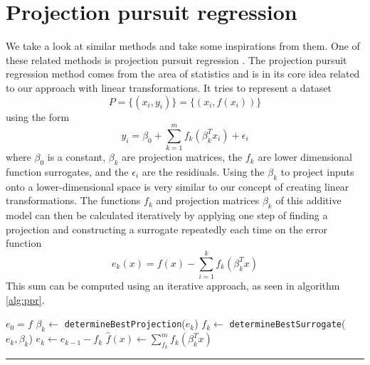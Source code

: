 \documentclass[
  a4paper,  %
  twoside,  %
  bibliography=totoc,
  headsepline,
  cleardoublepage=empty,
  parskip=half,
  draft=false
]{scrbook}
\newcommand{\delimit}{{\color{charcoal}\noindent\rule{\textwidth}{1pt}}}
\begin{document}
\section{Projection pursuit regression}

We take a look at similar methods and take some inspirations from them.
One of these related methods is projection pursuit regression \cite{}.
The projection pursuit regression method comes from the area of statistics and is in its core idea related to our approach with linear transformations.
It tries to represent a dataset
\begin{equation}
P=\{(x_i, y_i)\}=\{(x_i, f(x_i))\}
\end{equation}
using the form
\begin{equation}
y_i=\beta_0 + \sum_{k=1}^m f_k(\beta_k^T x_i) + \epsilon_i
\label{ppr}
\end{equation}
where $\beta_0$ is a constant, $\beta_k$ are projection matrices, the $f_k$ are lower dimensional function surrogates, and the $\epsilon_i$ are the residiuals.
Using the $\beta_k$ to project inputs onto a lower-dimensional space is very similar to our concept of creating linear transformations.
The functions $f_k$ and projection matrices $\beta_k$ of this additive model can then be calculated iteratively by applying one step of finding a projection and constructing a surrogate repeatedly each time on the error function
\begin{equation}
e_k(x)=f(x) - \sum_{i=1}^k f_k(\beta_k^T x)
\end{equation}
This sum can be computed using an iterative approach, as seen in algorithm \cref{alg:ppr}.

\newpage

\begin{mdframed}[style=algstyle,frametitle={\textbf{function} \texttt{projectionPursuitRegression}{$(f, k_{\text{max}})$}}]
\normalsize
\vspace{5.5mm}
\begin{algorithmic}[1]

    \State $e_0 = f$
    	\State $\beta_k \gets$ \texttt{determineBestProjection}($e_k$)
    	\State $f_k \gets$ \texttt{determineBestSurrogate}($e_k, \beta_k$)
    	\State $e_k \gets e_{k - 1} - f_k$
    \EndFor
    \State $\hat{f}(x) \gets \sum_{f_k}^m f_k(\beta_k^T x)$
    \State {}
\end{algorithmic}

\vspace{-1.5mm}
\delimit

	\label{alg:ppr}
\end{mdframed}
\end{document}
